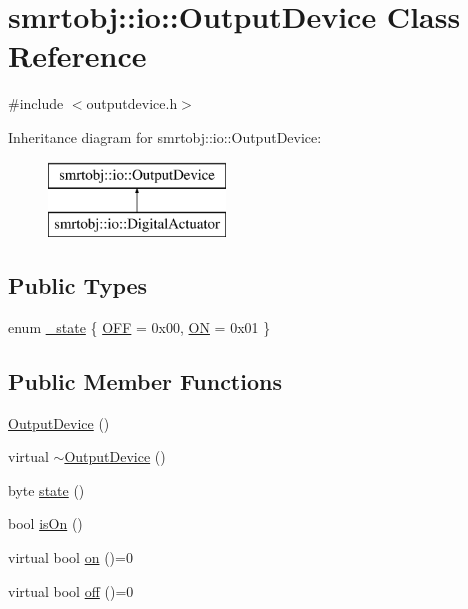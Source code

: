 \hypertarget{classsmrtobj_1_1io_1_1_output_device}{}\section{smrtobj\+:\+:io\+:\+:Output\+Device Class Reference}
\label{classsmrtobj_1_1io_1_1_output_device}


{\ttfamily \#include $<$outputdevice.\+h$>$}

Inheritance diagram for smrtobj\+:\+:io\+:\+:Output\+Device\+:\begin{figure}[H]
\begin{center}
\leavevmode
\includegraphics[height=2.000000cm]{classsmrtobj_1_1io_1_1_output_device}
\end{center}
\end{figure}
\subsection*{Public Types}
\begin{DoxyCompactItemize}
\item 
enum \hyperlink{classsmrtobj_1_1io_1_1_output_device_a0c8010d79d7229137e4669f855c3e18b}{\+\_\+state} \{ \hyperlink{classsmrtobj_1_1io_1_1_output_device_a0c8010d79d7229137e4669f855c3e18bac62cfce3ffab38b57bd81231f49ef59d}{O\+F\+F} = 0x00, 
\hyperlink{classsmrtobj_1_1io_1_1_output_device_a0c8010d79d7229137e4669f855c3e18ba28836c3fcc1c07cf6ee9a30a3ff53f94}{O\+N} = 0x01
 \}
\end{DoxyCompactItemize}
\subsection*{Public Member Functions}
\begin{DoxyCompactItemize}
\item 
\hyperlink{classsmrtobj_1_1io_1_1_output_device_a20a06b3b5cbaf8ff52118c2ef96c98ee}{Output\+Device} ()
\item 
virtual \hyperlink{classsmrtobj_1_1io_1_1_output_device_a184fef394e438e63b5b048cb302621c6}{$\sim$\+Output\+Device} ()
\item 
byte \hyperlink{classsmrtobj_1_1io_1_1_output_device_a4ad9f8f79001b7ad72be8faab9fe97a2}{state} ()
\item 
bool \hyperlink{classsmrtobj_1_1io_1_1_output_device_a0bf4746694296b538b22da4faa1ca4e3}{is\+On} ()
\item 
virtual bool \hyperlink{classsmrtobj_1_1io_1_1_output_device_a9154253249a8e95d69fa9d4ade592049}{on} ()=0
\item 
virtual bool \hyperlink{classsmrtobj_1_1io_1_1_output_device_a2700863f90da699cb82835ea6bb1f2f5}{off} ()=0
\end{DoxyCompactItemize}

